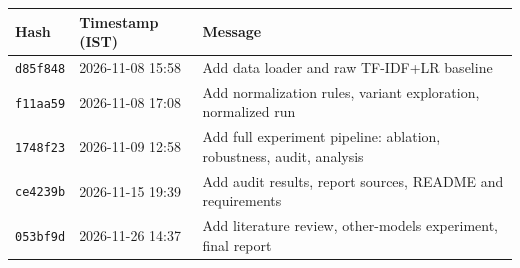 \scriptsize
\begin{tabular}{@{}l l p{1.6in}@{}}
\toprule
Hash & Timestamp (IST) & Message\\
\midrule
\texttt{d85f848} & 2026-11-08 15:58 & Add data loader and raw TF-IDF+LR baseline\\
\texttt{f11aa59} & 2026-11-08 17:08 & Add normalization rules, variant exploration, normalized run\\
\texttt{1748f23} & 2026-11-09 12:58 & Add full experiment pipeline: ablation, robustness, audit, analysis\\
\texttt{ce4239b} & 2026-11-15 19:39 & Add audit results, report sources, README and requirements\\
\texttt{053bf9d} & 2026-11-26 14:37 & Add literature review, other-models experiment, final report\\
\bottomrule
\end{tabular}
